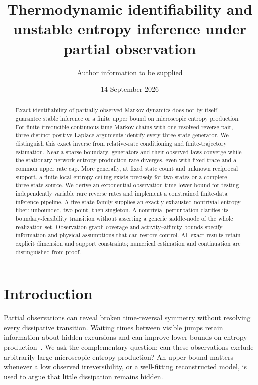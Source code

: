 \documentclass[aps,pre,onecolumn,11pt,longbibliography,notitlepage]{revtex4-2}
\newcommand{\1}{\mathbf 1}
\begin{document}
\title{Thermodynamic identifiability and unstable entropy inference under partial observation}
\author{Author information to be supplied}
\noaffiliation
\date{14 September 2026}
\begin{abstract}
Exact identifiability of partially observed Markov dynamics does not by itself guarantee stable inference or a finite upper bound on microscopic entropy production. For finite irreducible continuous-time Markov chains with one resolved reverse pair, three distinct positive Laplace arguments identify every three-state generator. We distinguish this exact inverse from relative-rate conditioning and finite-trajectory estimation. Near a sparse boundary, generators and their observed laws converge while the stationary network entropy-production rate diverges, even with fixed trace and a common upper rate cap. More generally, at fixed state count and unknown reciprocal support, a finite local entropy ceiling exists precisely for two states or a complete three-state source. We derive an exponential observation-time lower bound for testing independently variable rare reverse rates and implement a constrained finite-data inference pipeline. A five-state family supplies an exactly exhausted nontrivial entropy fiber: unbounded, two-point, then singleton. A nontrivial perturbation clarifies its boundary-feasibility transition without asserting a generic saddle-node of the whole realization set. Observation-graph coverage and activity--affinity bounds specify information and physical assumptions that can restore control. All exact results retain explicit dimension and support constraints; numerical estimation and continuation are distinguished from proof.
\end{abstract}
\maketitle

\section{Introduction}\label{sec:intro}
Partial observations can reveal broken time-reversal symmetry without resolving every dissipative transition. Waiting times between visible jumps retain information about hidden excursions and can improve lower bounds on entropy production~\cite{vanDerMeer2022,Harunari2022,Maier2025}. We ask the complementary question: can these observations exclude arbitrarily large microscopic entropy production? An upper bound matters whenever a low observed irreversibility, or a well-fitting reconstructed model, is used to argue that little dissipation remains hidden.
\end{document}
